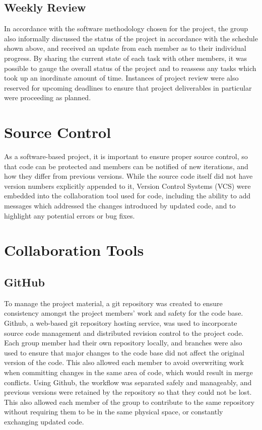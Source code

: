 		\subsection{Weekly Review}
In accordance with the software methodology chosen for the project, the group also informally discussed the status of the project in accordance with the schedule shown above, and received an update from each member as to their individual progress. By sharing the current state of each task with other members, it was possible to gauge the overall status of the project and to reassess any tasks which took up an inordinate amount of time. Instances of project review were also reserved for upcoming deadlines to ensure that project deliverables in particular were proceeding as planned.
	\section{Source Control}
As a software-based project, it is important to ensure proper source control, so that code can be protected and members can be notified of new iterations, and how they differ from previous versions. While the source code itself did not have version numbers explicitly appended to it, Version Control Systems (VCS) were embedded into the collaboration tool used for code, including the ability to add messages which addressed the changes introduced by updated code, and to highlight any potential errors or bug fixes.
	\section{Collaboration Tools}
		\subsection{GitHub}
To manage the project material, a git repository was created to ensure consistency amongst the project members’ work and safety for the code base. Github, a web-based git repository hosting service, was used to incorporate source code management and distributed revision control to the project code. Each group member had their own repository locally, and branches were also used to ensure that major changes to the code base did not affect the original version of the code. This also allowed each member to avoid overwriting work when committing changes in the same area of code, which would result in merge conflicts. Using Github, the workflow was separated safely and manageably, and previous versions were retained by the repository so that they could not be lost. This also allowed each member of the group to contribute to the same repository without requiring them to be in the same physical space, or constantly exchanging updated code.
